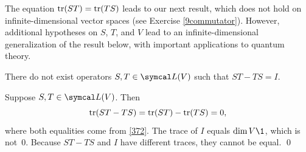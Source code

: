 
The equation $\operatorname{tr}(ST) = \operatorname{tr}(TS)$ leads to our next result, which does not hold on infinite-dimensional vector spaces (see Exercise \ref{9commutator}). However, additional hypotheses on $S$, $T$, and $V$ lead to an infinite-dimensional generalization of the result below, with important applications to quantum theory.

{There do not exist operators $S, T \in \L(V)$ such that $ST - TS = I$.}

\proof
Suppose $S, T \in \L(V)$. Then
\[
\operatorname{tr}(ST - TS) = \operatorname{tr}(ST) - \operatorname{tr}(TS) = 0,
\]
where both equalities come from \ref{372}. The trace of
$I$ equals $\dim V\1$, which is not~$0$.  Because $ST - TS$ and $I$ have
different traces, they cannot be equal.
\qed

